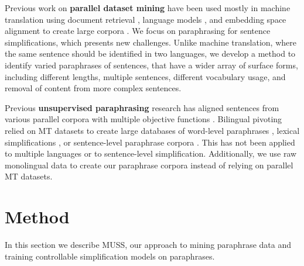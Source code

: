 \documentclass[11pt]{article}
\newcommand{\muss}{\textsc{MUSS}\xspace}
\begin{document}
Previous work on {\bf parallel dataset mining} have been used mostly in machine translation using document retrieval \cite{munteanu-marcu-2005-improving}, language models \cite{koehn-etal-2018-findings,koehn2019findings},
and embedding space alignment \cite{artetxe2019massively} to create large corpora \cite{tiedemann2012parallel,schwenk2019ccmatrix}.
We focus on paraphrasing for sentence simplifications, which presents new challenges. Unlike machine translation, where the same sentence should be identified in two languages, we develop a method to identify varied paraphrases of sentences, that have a wider array of surface forms, including different lengths, multiple sentences, different vocabulary usage, and removal of content from more complex sentences. 

Previous {\bf unsupervised paraphrasing} research has aligned sentences from various parallel corpora \cite{barzilay2003learning} with multiple objective functions \cite{liu2019unsupervised}.
Bilingual pivoting relied on MT datasets to create large databases of word-level paraphrases \cite{pavlick2015ppdb}, lexical simplifications \cite{pavlick2016simple,kriz-etal-2018-simplification}, or sentence-level paraphrase corpora \cite{wieting-gimpel-2018-paranmt}.
This has not been applied to multiple languages or to sentence-level simplification. Additionally, we use raw monolingual data to create our paraphrase corpora instead of relying on parallel MT datasets.

 \section{Method}

In this section we describe \muss, our approach to mining paraphrase data and training controllable simplification models on paraphrases.
\end{document}
